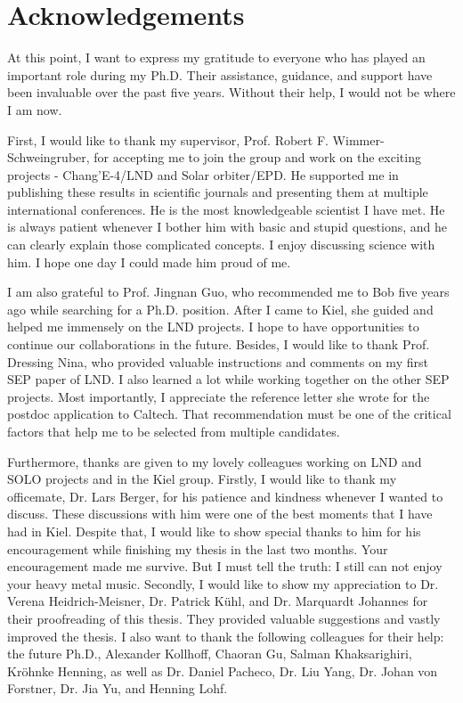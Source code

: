 \chapter*{Acknowledgements}

At this point, I want to express my gratitude to everyone who has played an important role during my Ph.D. Their assistance, guidance, and support have been invaluable over the past five years. Without their help, I would not be where I am now.

First, I would like to thank my supervisor, Prof. Robert F. Wimmer-Schweingruber, for accepting me to join the group and work on the exciting projects - Chang'E-4/LND and Solar orbiter/EPD. He supported me in publishing these results in scientific journals and presenting them at multiple international conferences. He is the most knowledgeable scientist I have met. He is always patient whenever I bother him with basic and stupid questions, and he can clearly explain those complicated concepts. I enjoy discussing science with him. I hope one day I could made him proud of me. 

I am also grateful to Prof. Jingnan Guo, who recommended me to Bob five years ago while searching for a Ph.D. position. After I came to Kiel, she guided and helped me immensely on the LND projects. I hope to have opportunities to continue our collaborations in the future. Besides, I would like to thank Prof. Dressing Nina, who provided valuable instructions and comments on my first SEP paper of LND. I also learned a lot while working together on the other SEP projects. Most importantly, I appreciate the reference letter she wrote for the postdoc application to Caltech. That recommendation must be one of the critical factors that help me to be selected from multiple candidates.

Furthermore, thanks are given to my lovely colleagues working on LND and SOLO projects and in the Kiel group. Firstly, I would like to thank my officemate, Dr. Lars Berger, for his patience and kindness whenever I wanted to discuss. These discussions with him were one of the best moments that I have had in Kiel. Despite that, I would like to show special thanks to him for his encouragement while finishing my thesis in the last two months. Your encouragement made me survive. But I must tell the truth: I still can not enjoy your heavy metal music. Secondly, I would like to show my appreciation to Dr. Verena Heidrich-Meisner, Dr. Patrick K\"{u}hl, and Dr. Marquardt Johannes for their proofreading of this thesis. They provided valuable suggestions and vastly improved the thesis. I also want to thank the following colleagues for their help: the future Ph.D., Alexander Kollhoff, Chaoran Gu, Salman Khaksarighiri, Kr\"{o}hnke Henning, as well as Dr. Daniel Pacheco, Dr. Liu Yang, Dr. Johan von Forstner, Dr. Jia Yu, and Henning Lohf. 


